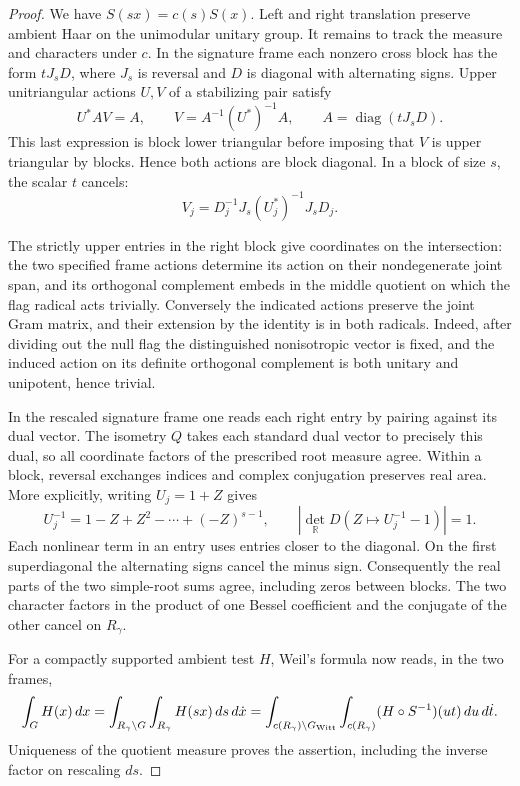 \begin{proof}
We have \(S(sx)=c(s)S(x)\). Left and right translation preserve
ambient Haar on the unimodular unitary group. It remains to track
the measure and characters under \(c\). In the signature frame each
nonzero cross block has the form \(tJ_sD\), where \(J_s\) is reversal
and \(D\) is diagonal with alternating signs. Upper unitriangular
actions \(U,V\) of a stabilizing pair satisfy
\[
 U^* A V=A,\qquad
 V=A^{-1}(U^*)^{-1}A,\qquad A=\operatorname{diag}(tJ_sD).
\]
This last expression is block lower triangular before imposing that
\(V\) is upper triangular by blocks. Hence both actions are block
diagonal. In a block of size \(s\), the scalar \(t\) cancels:
\[
                 V_j=D_j^{-1}J_s(U_j^*)^{-1}J_sD_j.
\]

The strictly
upper entries in the right block give coordinates on the
intersection: the two specified frame actions determine its action
on their nondegenerate joint span, and its orthogonal complement
embeds in the middle quotient on which the flag radical acts
trivially. Conversely the indicated actions preserve the joint Gram
matrix, and their extension by the identity is in both radicals.
Indeed, after dividing out the null flag the distinguished
nonisotropic vector is fixed, and the induced action on its definite
orthogonal complement is both unitary and unipotent, hence trivial.

In the rescaled signature frame one reads each right entry by
pairing against its dual vector. The isometry \(Q\) takes each
standard dual vector to precisely this dual, so all coordinate
factors of the prescribed root measure agree. Within a block,
reversal exchanges indices and complex conjugation preserves real
area. More explicitly, writing \(U_j=1+Z\) gives
\[
      U_j^{-1}=1-Z+Z^2-\cdots+(-Z)^{s-1},\qquad
      |\det_{\mathbb R}D(Z\mapsto U_j^{-1}-1)|=1 .
\]
Each nonlinear term in an entry uses entries closer to the diagonal. On the first superdiagonal the alternating
signs cancel the minus sign. Consequently the real parts of the
two simple-root sums agree, including zeros between blocks. The
two character factors in the product of one Bessel coefficient and
the conjugate of the other cancel on \(R_\gamma\).

For a compactly supported ambient test \(H\), Weil's formula now
reads, in the two frames,
\[
 \int_G H(x)\,dx
 =\int_{R_\gamma\backslash G}\int_{R_\gamma}H(sx)\,ds\,d\dot x
 =\int_{c(R_\gamma)\backslash G_{\rm Witt}}
     \int_{c(R_\gamma)} (H\circ S^{-1})(ut)\,du\,d\dot t .
\]
Uniqueness of the quotient measure proves the assertion, including
the inverse factor on rescaling \(ds\).
\end{proof}

